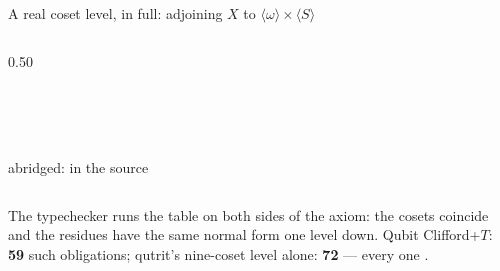 \begin{frame}{A real coset level, in full: adjoining $X$ to $\langle\omega\rangle\times\langle S\rangle$ \InPaper}
\begin{columns}[T]
\begin{column}{0.50\textwidth}
\begin{code}
\AgdaSymbol{(}\AgdaSpace{}%
\AgdaSymbol{\{}\AgdaSymbol{\})}\AgdaSpace{}%
\AgdaSymbol{=}\AgdaSpace{}%
\AgdaSpace{}%
\AgdaSpace{}%
\AgdaOperator{\AgdaInductiveConstructor{,}}\AgdaSpace{}%
\<%
\\
%
\>[2]\AgdaSpace{}%
\AgdaSpace{}%
\AgdaSymbol{(}\AgdaSpace{}%
\AgdaSymbol{\{}\AgdaSymbol{\})}\AgdaSpace{}%
\AgdaSymbol{=}\AgdaSpace{}%
\AgdaSpace{}%
\AgdaSpace{}%
\AgdaOperator{\AgdaInductiveConstructor{,}}\AgdaSpace{}%
\<%
\\
%
\>[2]\AgdaSpace{}%
\AgdaSpace{}%
\AgdaSymbol{(}\AgdaSpace{}%
\AgdaSymbol{\{}\AgdaSymbol{\})}\AgdaSpace{}%
\AgdaSymbol{=}\AgdaSpace{}%
\AgdaSpace{}%
\AgdaSpace{}%
\AgdaOperator{\AgdaInductiveConstructor{,}}\AgdaSpace{}%
\<%
\\
%
\>[2]\<%
\end{code}
{\scriptsize abridged:  in the source}
\end{column}
\end{columns}
\begin{keybox}
\small The typechecker runs the table on both sides of the axiom: the cosets
coincide and the residues have the same normal form one level down.
Qubit Clifford+$T$: \textbf{59} such obligations; qutrit's nine-coset level
alone: \textbf{72} --- every one .
\end{keybox}
\end{frame}

